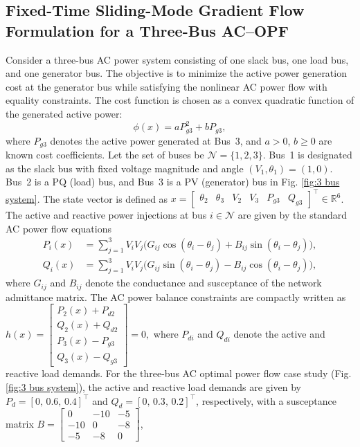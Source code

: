 \documentclass[letterpaper, 10 pt, conference]{ieeeconf}
\begin{document}
\subsection{Fixed-Time Sliding-Mode Gradient Flow Formulation for a Three-Bus AC--OPF}
Consider a three-bus AC power system consisting of one slack bus, one load bus, and one generator bus. The objective is to minimize the active power generation cost at the generator bus while satisfying the nonlinear AC power flow with equality constraints. The cost function is chosen as a convex quadratic function of the generated active power:
\begin{equation}
\phi(x) = a P_{g3}^{2} + b P_{g3},
\label{eq:cost}
\end{equation}
where $P_{g3}$ denotes the active power generated at Bus~3, and $a>0$, $b\ge 0$ are known cost coefficients.
Let the set of buses be $\mathcal{N}=\{1,2,3\}$.  
Bus~1 is designated as the slack bus with fixed voltage magnitude and angle $(V_1,\theta_1)=(1,0)$.
Bus~2 is a PQ (load) bus, and Bus~3 is a PV (generator) bus in Fig. \ref{fig:3 bus system}. The state vector is defined as $x =
\begin{bmatrix}
\theta_2 & \theta_3 & V_2 & V_3 & P_{g3} & Q_{g3}
\end{bmatrix}^{\top}
\in \mathbb{R}^{6}$.
The active and reactive power injections at bus $i\in\mathcal{N}$ are given by the standard AC power flow equations
\begin{align}
P_i(x) &=
\sum_{j=1}^{3} V_i V_j
\big(
G_{ij}\cos(\theta_i-\theta_j)
+
B_{ij}\sin(\theta_i-\theta_j)
\big),  \nonumber\\
Q_i(x) &=
\sum_{j=1}^{3} V_i V_j
\big(
G_{ij}\sin(\theta_i-\theta_j)
-
B_{ij}\cos(\theta_i-\theta_j)
\big),
\end{align}
where $G_{ij}$ and $B_{ij}$ denote the conductance and susceptance of the network admittance matrix. The AC power balance constraints are compactly written as 
$h(x) =
\begin{bmatrix}
P_2(x) + P_{d2} \\
Q_2(x) + Q_{d2} \\
P_3(x) - P_{g3} \\
Q_3(x) - Q_{g3}
\end{bmatrix}
= 0,$
where $P_{di}$ and $Q_{di}$ denote the active and reactive load demands. For the three-bus AC optimal power flow case study (Fig. \ref{fig:3 bus system}), the active and reactive load demands are given by $P_d=[0,\,0.6,\,0.4]^\top$ and $Q_d=[0,\,0.3,\,0.2]^\top$, respectively, with a susceptance matrix $B=\begin{bmatrix}
0 & -10 & -5\\
-10 & 0 & -8\\
-5 & -8 & 0
\end{bmatrix}$,
\end{document}
